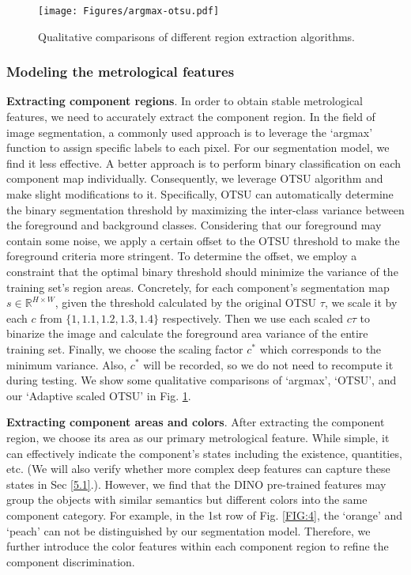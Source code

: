\documentclass[final,5p,times,twocolumn]{elsarticle}
\begin{document}
\begin{figure}
\centering
		\texttt{[image: Figures/argmax-otsu.pdf]}\caption{Qualitative comparisons of different region extraction algorithms.}
	\label{FIG:5}
\end{figure}




\subsubsection{Modeling the metrological features}
\label{3.2.2}
\textbf{Extracting component regions}. In order to obtain stable metrological features, we need to accurately extract the component region. In the field of image segmentation, a commonly used approach is to leverage the `argmax' function to assign specific labels to each pixel. For our segmentation model, we find it less effective. A better approach is to perform binary classification on each component map individually. Consequently, we leverage OTSU algorithm and make slight modifications to it. Specifically, OTSU can automatically determine the binary segmentation threshold by maximizing the inter-class variance between the foreground and background classes. Considering that our foreground may contain some noise, we apply a certain offset to the OTSU threshold to make the foreground criteria more stringent. To determine the offset, we employ a constraint that the optimal binary threshold should minimize the variance of the training set's region areas. Concretely, for each component's segmentation map $s \in \mathbb{R}^{H \times W}$, given the threshold calculated by the original OTSU  $\tau$, we scale it by each $c$ from $\{1, 1.1, 1.2, 1.3, 1.4\}$ respectively. Then we use each scaled $c\tau$ to binarize the image and calculate the foreground area variance of the entire training set. Finally, we choose the scaling factor $c^*$ which corresponds to the minimum variance. Also, $c^*$ will be recorded, so we do not need to recompute it during testing. We show some qualitative comparisons of `argmax', `OTSU', and our `Adaptive scaled OTSU' in Fig. \ref{FIG:5}.   

\textbf{Extracting component areas and colors}. After extracting the component region, we choose its area as our primary metrological feature. While simple, it can effectively indicate the component's states including the existence, quantities, etc. (We will also verify whether more complex deep features can capture these states in Sec \ref{5.1}.). However, we find that the DINO pre-trained features may group the objects with similar semantics but different colors into the same component category. For example, in the 1st row of Fig. \ref{FIG:4}, the `orange' and `peach' can not be distinguished by our segmentation model. Therefore, we further introduce the color features within each component region to refine the component discrimination.
\end{document}
